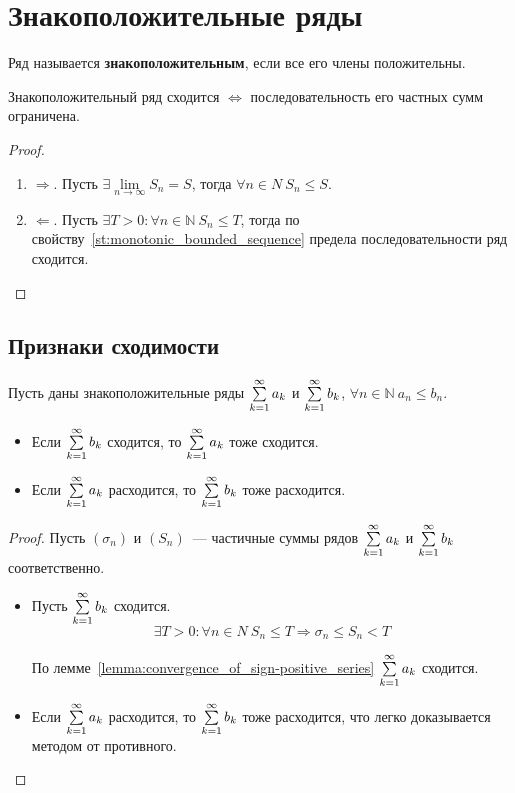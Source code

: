 \section{Знакоположительные ряды}
 Ряд называется \textbf{знакоположительным}, если все его члены положительны.

\begin{lemma}
\label{lemma:convergence_of_sign-positive_series}
Знакоположительный ряд сходится $\Leftrightarrow$ последовательность его частных сумм ограничена.
\end{lemma}
\begin{proof}
\begin{enumerate}
	\item $\Rightarrow$. Пусть $\exists \lim\limits_{n \to \infty} S_n = S$, тогда $\forall n \in N \ S_n \leqslant S$.
	\item $\Leftarrow$. Пусть $\exists T > 0 \colon \forall n \in \mathbb N \ S_n \leqslant T$, тогда по свойству~\ref{st:monotonic_bounded_sequence} предела последовательности ряд сходится.
\end{enumerate}
\end{proof}

\subsection{Признаки сходимости}
\begin{theorem}
Пусть даны знакоположительные ряды $\series a_k$ и $\series b_k$, $\forall n \in \mathbb N \ a_n \leqslant b_n$.
\begin{itemize}
	\item Если $\series b_k$ сходится, то $\series a_k$ тоже сходится.
	\item Если $\series a_k$ расходится, то $\series b_k$ тоже расходится.
\end{itemize}
\end{theorem}
\begin{proof}
Пусть $(\sigma_n)$ и $(S_n)$~--- частичные суммы рядов $\series a_k$ и $\series b_k$ соответственно.
\begin{itemize}
	\item Пусть $\series b_k$ сходится.
	\begin{equation*}
	\exists T > 0 \colon \forall n \in N \ S_n \leqslant T \Rightarrow
	\sigma_n \leqslant S_n < T
	\end{equation*}
	
	По лемме~\ref*{lemma:convergence_of_sign-positive_series} $\series a_k$ сходится.
	
	\item Если $\series a_k$ расходится, то $\series b_k$ тоже расходится, что легко доказывается методом от противного.
\end{itemize}
\end{proof}

